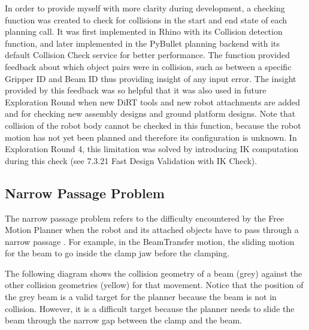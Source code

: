 In order to provide myself with more clarity during development, a checking function was created to check for collisions in the start and end state of each planning call. It was first implemented in Rhino with its Collision detection function, and later implemented in the PyBullet planning backend \parencite{coumansPyBulletPythonModule2016, huangCompas_fab_pychoreo2023} with its default Collision Check service for better performance. The function provided feedback about which object pairs were in collision, such as between a specific Gripper ID and Beam ID thus providing insight of any input error.
The insight provided by this feedback was so helpful that it was also used in future Exploration Round when new DiRT tools and new robot attachments are added and for checking new assembly designs and ground platform designs. 
Note that collision of the robot body cannot be checked in this function, because the robot motion has not yet been planned and therefore its configuration is unknown. In Exploration Round 4, this limitation was solved by introducing IK computation during this check (see 7.3.21 Fast Design Validation with IK Check).

\subsection{Narrow Passage Problem}
\label{subsection:exploration_2_narrow_passage_problem}

The narrow passage problem refers to the difficulty encountered by the Free Motion Planner when the robot and its attached objects have to pass through a narrow passage \parencite{lavallePlanningAlgorithms2006}. For example, in the BeamTransfer motion, the sliding motion for the beam to go inside the clamp jaw before the clamping. 

The following diagram shows the collision geometry of a beam (grey) against the other collision geometries (yellow) for that movement. Notice that the position of the grey beam is a valid target for the planner because the beam is not in collision. However, it is a difficult target because the planner needs to slide the beam through the narrow gap between the clamp and the beam. 

